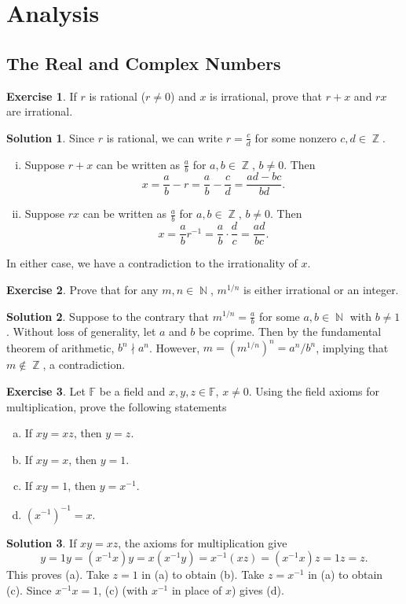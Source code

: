 \documentclass{article}
\theoremstyle{definition}
\newtheorem{exercise}{Exercise}
\newtheorem*{solution}{Solution}
\DeclareMathOperator{\N}{\mathbb{N}}
\DeclareMathOperator{\Z}{\mathbb{Z}}
\begin{document}
\section*{Analysis}
\subsection*{The Real and Complex Numbers}

\begin{exercise}
    If \(r\) is rational (\(r\neq0\)) and \(x\) is irrational, prove that \(r+x\) and \(rx\) are irrational.
\end{exercise}
\begin{solution}
    Since \(r\) is rational, we can write \(r=\frac{c}{d}\) for some nonzero \(c,d\in\Z\).
    \begin{enumerate}[(i)]
        \item Suppose \(r+x\) can be written as \(\frac{a}{b}\) for \(a,b\in\Z\), \(b\neq0\). Then 
        \[x=\frac{a}{b}-r=\frac{a}{b}-\frac{c}{d}=\frac{ad-bc}{bd}.\]
        \item Suppose \(rx\) can be written as \(\frac{a}{b}\) for \(a,b\in\Z\), \(b\neq0\). Then
        \[x=\frac{a}{b}r^{-1}=\frac{a}{b}\cdot\frac{d}{c}=\frac{ad}{bc}.\]
    \end{enumerate}
    In either case, we have a contradiction to the irrationality of \(x\).
\end{solution}

\begin{exercise}
    Prove that for any \(m,n\in\N\), \(m^{1/n}\) is either irrational or an integer.
\end{exercise}
\begin{solution}
    Suppose to the contrary that \(m^{1/n}=\frac{a}{b}\) for some \(a,b\in\N\) with \(b\neq1\). Without loss of generality, let \(a\) and \(b\) be coprime. Then by the fundamental theorem of arithmetic, \(b^n\nmid a^n\). However, \(m=(m^{1/n})^n=a^n/b^n\), implying that \(m\not\in\Z\), a contradiction.
\end{solution}

\begin{exercise}
    Let \(\mathbb{F}\) be a field and \(x,y,z\in\mathbb{F}\), \(x\neq0\). Using the field axioms for multiplication, prove the following statements
    \begin{enumerate}[(a)]
        \item If \(xy=xz\), then \(y=z\).
        \item If \(xy=x\), then \(y=1\).
        \item If \(xy=1\), then \(y=x^{-1}\).
        \item \((x^{-1})^{-1}=x\).
    \end{enumerate}
\end{exercise}
\begin{solution}
    If \(xy=xz\), the axioms for multiplication give
    \[y=1y=(x^{-1}x)y=x(x^{-1}y)=x^{-1}(xz)=(x^{-1}x)z=1z=z.\]
    This proves (a). Take \(z=1\) in (a) to obtain (b). Take \(z=x^{-1}\) in (a) to obtain (c). Since \(x^{-1}x=1\), (c) (with \(x^{-1}\) in place of \(x\)) gives (d).
\end{solution}
\end{document}

